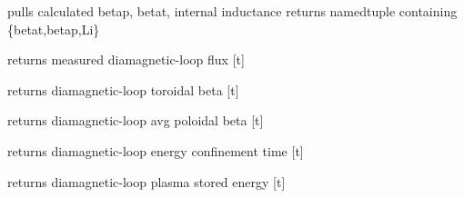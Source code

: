 \documentclass[letterpaper,10pt,english]{sphinxmanual}
\begin{document}
\begin{fulllineitems}
\begin{fulllineitems}
\end{fulllineitems}


\begin{fulllineitems}
\label{eqtools:eqtools.EFIT.EFITTree.getBetas}
pulls calculated betap, betat, internal inductance
returns namedtuple containing \{betat,betap,Li\}

\end{fulllineitems}


\begin{fulllineitems}
\label{eqtools:eqtools.EFIT.EFITTree.getDiamagFlux}
returns measured diamagnetic-loop flux {[}t{]}

\end{fulllineitems}


\begin{fulllineitems}
\label{eqtools:eqtools.EFIT.EFITTree.getDiamagBetaT}
returns diamagnetic-loop toroidal beta {[}t{]}

\end{fulllineitems}


\begin{fulllineitems}
\label{eqtools:eqtools.EFIT.EFITTree.getDiamagBetaP}
returns diamagnetic-loop avg poloidal beta {[}t{]}

\end{fulllineitems}


\begin{fulllineitems}
\label{eqtools:eqtools.EFIT.EFITTree.getDiamagTauE}
returns diamagnetic-loop energy confinement time {[}t{]}

\end{fulllineitems}


\begin{fulllineitems}
\label{eqtools:eqtools.EFIT.EFITTree.getDiamagWp}
returns diamagnetic-loop plasma stored energy {[}t{]}


\end{fulllineitems}
\end{fulllineitems}
\end{document}
